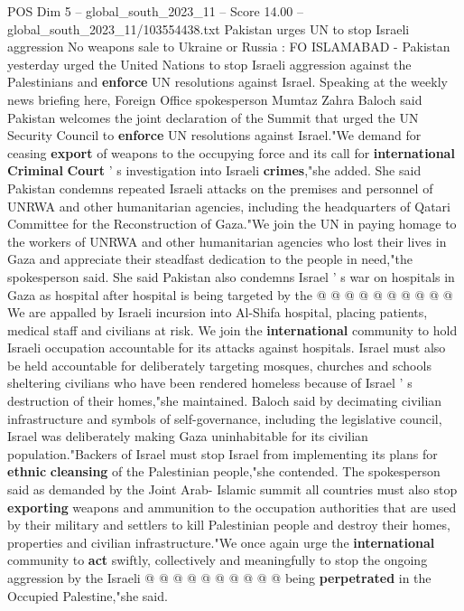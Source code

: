 \begin{textsample}{POS Dim 5 – global\_south\_2023\_11 – Score 14.00 – global\_south\_2023\_11/103554438.txt}  \label{ex:f5_pos_274}
Pakistan urges UN to stop Israeli aggression No weapons sale to Ukraine or Russia : FO ISLAMABAD - Pakistan yesterday urged the United Nations to stop Israeli aggression against the Palestinians and \textbf{enforce} UN resolutions against Israel.
Speaking at the weekly news briefing here, Foreign Office spokesperson Mumtaz Zahra Baloch said Pakistan welcomes the joint declaration of the Summit that urged the UN Security Council to \textbf{enforce} UN resolutions against Israel."We demand for ceasing \textbf{export} of weapons to the occupying force and its call for \textbf{international} \textbf{Criminal} \textbf{Court} ' s investigation into Israeli \textbf{crimes},"she added.
She said Pakistan condemns repeated Israeli attacks on the premises and personnel of UNRWA and other humanitarian agencies, including the headquarters of Qatari Committee for the Reconstruction of Gaza."We join the UN in paying homage to the workers of UNRWA and other humanitarian agencies who lost their lives in Gaza and appreciate their steadfast dedication to the people in need,"the spokesperson said.
She said Pakistan also condemns Israel ' s war on hospitals in Gaza as hospital after hospital is being targeted by the @ @ @ @ @ @ @ @ @ @ We are appalled by Israeli incursion into Al-Shifa hospital, placing patients, medical staff and civilians at risk.
We join the \textbf{international} community to hold Israeli occupation accountable for its attacks against hospitals.
Israel must also be held accountable for deliberately targeting mosques, churches and schools sheltering civilians who have been rendered homeless because of Israel ' s destruction of their homes,"she maintained.
Baloch said by decimating civilian infrastructure and symbols of self-governance, including the legislative council, Israel was deliberately making Gaza uninhabitable for its civilian population."Backers of Israel must stop Israel from implementing its plans for \textbf{ethnic} \textbf{cleansing} of the Palestinian people,"she contended.
The spokesperson said as demanded by the Joint Arab- Islamic summit all countries must also stop \textbf{exporting} weapons and ammunition to the occupation authorities that are used by their military and settlers to kill Palestinian people and destroy their homes, properties and civilian infrastructure."We once again urge the \textbf{international} community to \textbf{act} swiftly, collectively and meaningfully to stop the ongoing aggression by the Israeli @ @ @ @ @ @ @ @ @ @ being \textbf{perpetrated} in the Occupied Palestine,"she said.

\end{textsample}
